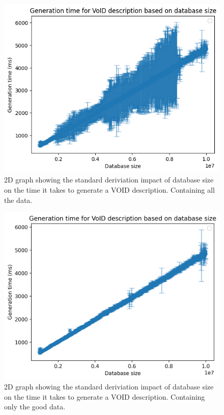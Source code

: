 \begin{figure}
    \centering
    \includegraphics[width=0.8\columnwidth]{figures/generation-results-graph.png}
    \caption{2D graph showing the standard deriviation impact of database size on the time it takes to generate a VOID description. Containing all the data.}
    \label{fig:generate-dbsize-all}
\end{figure}

\begin{figure}
    \centering
    \includegraphics[width=0.8\columnwidth]{figures/generation-results-graph-good.png}
    \caption{2D graph showing the standard deriviation impact of database size on the time it takes to generate a VOID description. Containing only the good data.}
    \label{fig:generate-dbsize-good}
\end{figure}

